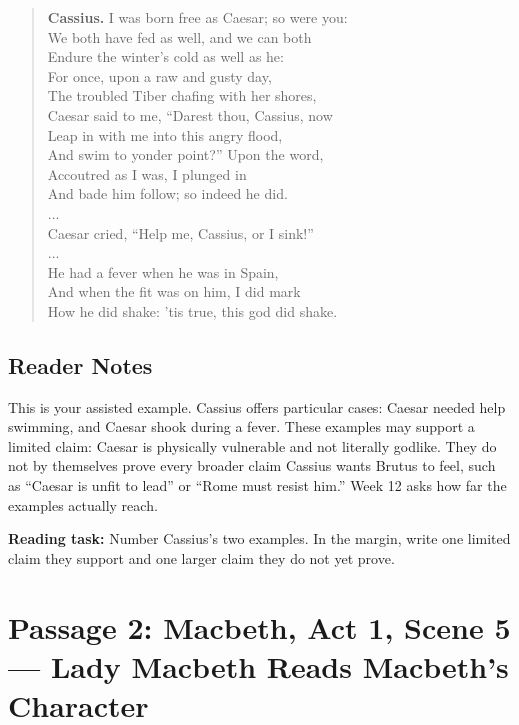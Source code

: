 \documentclass[12pt]{article}
\newenvironment{playpassage}{\begin{quote}\footnotesize\setlength{\parskip}{0.08em}\setlength{\parindent}{0pt}}{\end{quote}}
\newcommand{\speaker}[1]{\textbf{#1.}}
\begin{document}
\begin{playpassage}
\speaker{Cassius} I was born free as Caesar; so were you:\\
We both have fed as well, and we can both\\
Endure the winter's cold as well as he:\\
For once, upon a raw and gusty day,\\
The troubled Tiber chafing with her shores,\\
Caesar said to me, ``Darest thou, Cassius, now\\
Leap in with me into this angry flood,\\
And swim to yonder point?'' Upon the word,\\
Accoutred as I was, I plunged in\\
And bade him follow; so indeed he did.\\
...\\
Caesar cried, ``Help me, Cassius, or I sink!''\\
...\\
He had a fever when he was in Spain,\\
And when the fit was on him, I did mark\\
How he did shake: 'tis true, this god did shake.
\end{playpassage}

\subsection*{Reader Notes}

This is your assisted example. Cassius offers particular cases: Caesar needed help swimming, and Caesar shook during a fever. These examples may support a limited claim: Caesar is physically vulnerable and not literally godlike. They do not by themselves prove every broader claim Cassius wants Brutus to feel, such as ``Caesar is unfit to lead'' or ``Rome must resist him.'' Week 12 asks how far the examples actually reach.

\textbf{Reading task:} Number Cassius's two examples. In the margin, write one limited claim they support and one larger claim they do not yet prove.

\newpage

\section*{Passage 2: Macbeth, Act 1, Scene 5 --- Lady Macbeth Reads Macbeth's Character}
\end{document}
